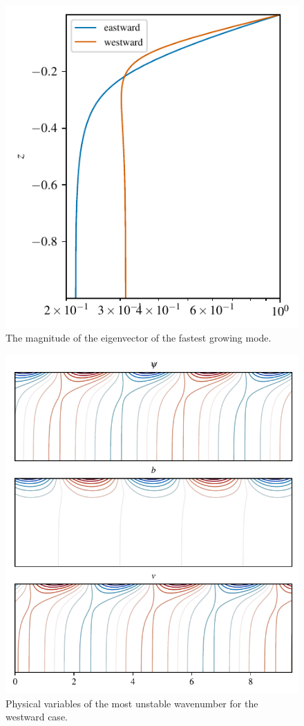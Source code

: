\begin{figure}
    \centering
    \includegraphics{Charney_evecmag}
    \caption{The magnitude of the eigenvector of the fastest growing mode.}
    \label{fig:Charney_evecmag}
\end{figure}

\begin{figure}
    \centering
    \includegraphics{Charney_instabprofile_west}
    \caption{Physical variables of the most unstable wavenumber for the westward case.}
    \label{fig:Charney_instabprofile_west}
\end{figure}

